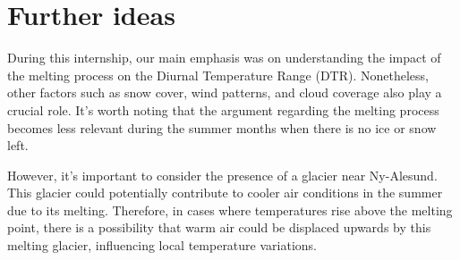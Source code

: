 \section{Further ideas}

During this internship, our main emphasis was on understanding the impact of the melting process on the Diurnal Temperature Range (DTR). Nonetheless, other factors such as snow cover, wind patterns, and cloud coverage also play a crucial role. It's worth noting that the argument regarding the melting process becomes less relevant during the summer months when there is no ice or snow left.

However, it's important to consider the presence of a glacier near Ny-Alesund. This glacier could potentially contribute to cooler air conditions in the summer due to its melting. Therefore, in cases where temperatures rise above the melting point, there is a possibility that warm air could be displaced upwards by this melting glacier, influencing local temperature variations.

